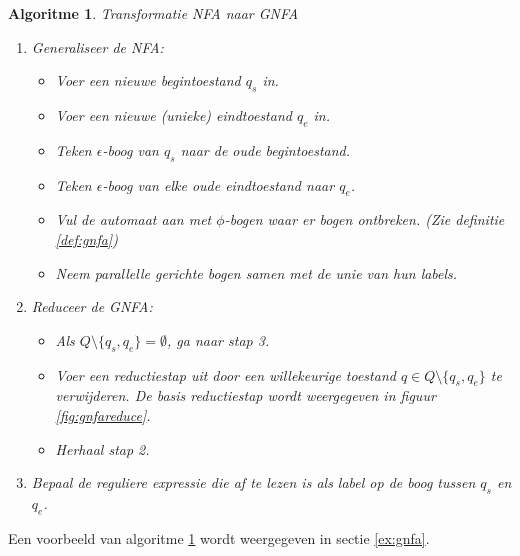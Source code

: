 \documentclass[a4paper]{article}
\newtheorem{talgo}{Algoritme}[section]
\newenvironment{algoritme}[1]%
  {\begin{mdframed}[backgroundcolor=silver,
    topline=false,
    rightline=false,
    leftline=false,
    bottomline=false]\begin{talgo}#1\\\normalfont}%
  {\end{talgo}\end{mdframed}}
\newenvironment{enumalgo}%
  {\begin{enumerate}[leftmargin=1.5cm,label=Stap \arabic*:]}%
  {\end{enumerate}}
\begin{document}
\begin{algoritme}{Transformatie NFA naar GNFA}
  \label{alg:nfagnfa}
  \vspace{-5mm}\begin{enumalgo}
  \item Generaliseer de NFA:
    \begin{itemize}
    \item Voer een nieuwe begintoestand $q_s$ in.
    \item Voer een nieuwe (unieke) eindtoestand $q_e$ in.
    \item Teken $\epsilon$-boog van $q_s$ naar de oude begintoestand.
    \item Teken $\epsilon$-boog van elke oude eindtoestand naar $q_e$.
    \item Vul de automaat aan met $\phi$-bogen waar er bogen ontbreken. (Zie definitie \ref{def:gnfa})
    \item Neem parallelle gerichte bogen samen met de unie van hun labels.
    \end{itemize}
  \item Reduceer de GNFA:
    \begin{itemize}
    \item Als $Q \setminus \{q_s, q_e\} = \emptyset$, ga naar stap 3.
    \item Voer een reductiestap uit door een willekeurige toestand $q \in Q \setminus \{q_s, q_e\}$ te verwijderen. De basis reductiestap wordt weergegeven in figuur \ref{fig:gnfareduce}.
    \item Herhaal stap 2.
    \end{itemize}
  \item Bepaal de reguliere expressie die af te lezen is als label op de boog tussen $q_s$ en $q_e$.
  \end{enumalgo}
\end{algoritme}

Een voorbeeld van algoritme \ref{alg:nfagnfa} wordt weergegeven in sectie \ref{ex:gnfa}.
\end{document}

